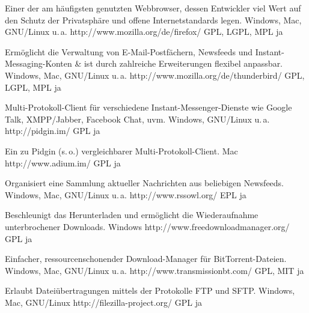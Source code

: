 




{Einer der am häufigsten genutzten Webbrowser, dessen Entwickler viel Wert auf den Schutz der Privatsphäre und offene Internetstandards legen.}
{Windows, Mac, GNU/Linux u.\,a.}
{http://www.mozilla.org/de/firefox/}
{GPL, LGPL, MPL}
{ja}

{Ermöglicht die Verwaltung von E-Mail-Postfächern, Newsfeeds und Instant-Messaging-Konten \& ist durch zahlreiche Erweiterungen flexibel anpassbar.}
{Windows, Mac, GNU/Linux u.\,a.}
{http://www.mozilla.org/de/thunderbird/}
{GPL, LGPL, MPL}
{ja}

{Multi-Protokoll-Client für verschiedene Instant-Messenger-Dienste wie \mbox{Google} Talk, XMPP/Jabber, Facebook Chat, uvm.}
{Windows, GNU/Linux u.\,a.}
{http://pidgin.im/}
{GPL}
{ja}

{Ein zu Pidgin (s.\,o.) vergleichbarer Multi-Protokoll-Client.}
{Mac}
{http://www.adium.im/}
{GPL}
{ja}

{Organisiert eine Sammlung aktueller Nachrichten aus beliebigen Newsfeeds.}
{Windows, Mac, GNU/Linux u.\,a.}
{http://www.rssowl.org/}
{EPL}
{ja}

{Beschleunigt das Herunterladen und ermöglicht die Wiederaufnahme unterbrochener Downloads.}
{Windows}
{http://www.freedownloadmanager.org/}
{GPL}
{ja}

{Einfacher, ressourcenschonender Download-Manager für BitTorrent-Dateien.}
{Windows, Mac, GNU/Linux u.\,a.}
{http://www.transmissionbt.com/}
{GPL, MIT}
{ja}

{Erlaubt Dateiübertragungen mittels der Protokolle FTP und SFTP.}
{Windows, Mac, GNU/Linux}
{http://filezilla-project.org/}
{GPL}
{ja}

\backpage


